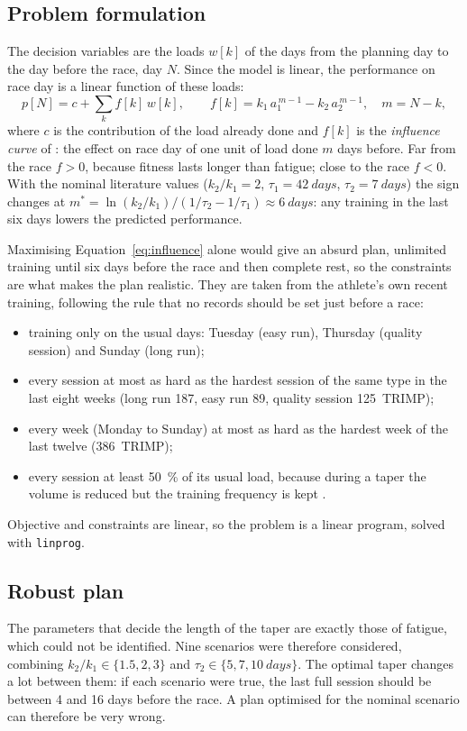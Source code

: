 \documentclass[11pt,a4paper]{article}
\begin{document}
\subsection{Problem formulation}
The decision variables are the loads $w[k]$ of the days from the planning day to
the day before the race, day $N$. Since the model is linear, the performance on
race day is a linear function of these loads:
\begin{equation}
p[N] = c + \sum_{k} f[k]\, w[k], \qquad
f[k] = k_1\, a_1^{\,m-1} - k_2\, a_2^{\,m-1}, \quad m = N - k,
\label{eq:influence}
\end{equation}
where $c$ is the contribution of the load already done and $f[k]$ is the
\emph{influence curve} of \citet{fitzclarke1991}: the effect on race day of one
unit of load done $m$ days before. Far from the race $f > 0$, because fitness
lasts longer than fatigue; close to the race $f < 0$. With the nominal
literature values ($k_2/k_1 = 2$, $\tau_1 = \SI{42}{days}$, $\tau_2 = \SI{7}{days}$)
the sign changes at
$m^* = \ln(k_2/k_1) / (1/\tau_2 - 1/\tau_1) \approx \SI{6}{days}$: any training
in the last six days lowers the predicted performance.

Maximising Equation~\eqref{eq:influence} alone would give an absurd plan,
unlimited training until six days before the race and then complete rest, so
the constraints are what makes the plan realistic. They are taken from the
athlete's own recent training, following the rule that no records should be
set just before a race:
\begin{itemize}
\item training only on the usual days: Tuesday (easy run), Thursday (quality
session) and Sunday (long run);
\item every session at most as hard as the hardest session of the same type in
the last eight weeks (long run 187, easy run 89, quality session
\SI{125}{TRIMP});
\item every week (Monday to Sunday) at most as hard as the hardest week of the
last twelve (\SI{386}{TRIMP});
\item every session at least \SI{50}{\percent} of its usual load, because during a
taper the volume is reduced but the training frequency is kept
\citep{mujika2003}.
\end{itemize}
Objective and constraints are linear, so the problem is a linear program, solved
with \texttt{linprog}.

\subsection{Robust plan}
The parameters that decide the length of the taper are exactly those of
fatigue, which could not be identified. Nine scenarios were therefore
considered, combining $k_2/k_1 \in \{1.5, 2, 3\}$ and
$\tau_2 \in \{5, 7, \SI{10}{days}\}$. The optimal taper changes a lot between
them: if each scenario were true, the last full session should be between 4 and
16 days before the race. A plan optimised for the nominal scenario can therefore
be very wrong.
\end{document}
